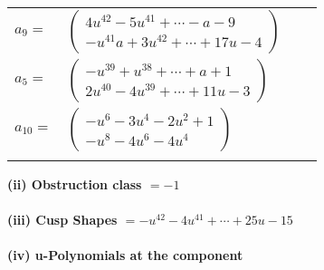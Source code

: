 \documentclass[1p]{elsarticle_modified}
\theoremstyle{definition}
\begin{document}
\begin{tabular}{m{7pt} m{180pt} m{7pt} m{180pt} }
\flushright $a_{9}=$&$\begin{pmatrix}4 u^{42}-5 u^{41}+\cdots- a-9\\- u^{41} a+3 u^{42}+\cdots+17 u-4\end{pmatrix}$ \\
\flushright $a_{5}=$&$\begin{pmatrix}- u^{39}+u^{38}+\cdots+a+1\\2 u^{40}-4 u^{39}+\cdots+11 u-3\end{pmatrix}$ \\
\flushright $a_{10}=$&$\begin{pmatrix}- u^6-3 u^4-2 u^2+1\\- u^8-4 u^6-4 u^4\end{pmatrix}$\\&\end{tabular}
\flushleft \textbf{(ii) Obstruction class $= -1$}\\~\\
\flushleft \textbf{(iii) Cusp Shapes $= - u^{42}-4 u^{41}+\cdots+25 u-15$}\\~\\
\newpage\renewcommand{\arraystretch}{1}
\flushleft \textbf{(iv) u-Polynomials at the component}\newline \\
\end{document}
